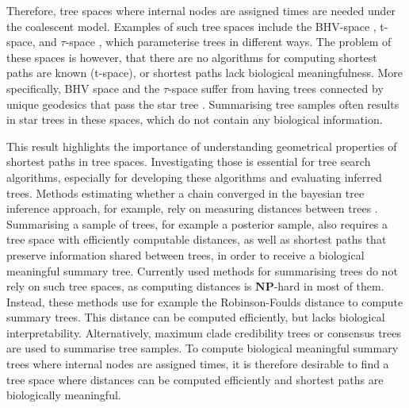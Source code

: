 \documentclass[11pt]{amsart}
\newcommand{\rnni}{\mathrm{RNNI}}
\newcommand{\dtt}{\mathrm{DCT}}
\newcommand{\np}{\mathbf{NP}}
\newcommand{\summary}[1]{} %
\begin{document}
\summary{How recent results about $\rnni$ make this space interesting and that it is strongly connected to $\dtt_m$}
Therefore, tree spaces where internal nodes are assigned times are needed under the coalescent model.
Examples of such tree spaces include the BHV-space \autocite{Billera2001-rj}, t-space, and $\tau$-space \autocite{Gavryushkin2016-uu}, which parameterise trees in different ways.
The problem of these spaces is however, that there are no algorithms for computing shortest paths are known (t-space), or shortest paths lack biological meaningfulness.
More specifically, BHV space and the $\tau$-space suffer from having trees connected by unique geodesics that pass the star tree \autocite{Gavryushkin2016-uu}.
Summarising tree samples often results in star trees in these spaces, which do not contain any biological information.

\summary{Why we want to investigate geometrical properties of $\dtt_m$ and $\rnni$}
This result highlights the importance of understanding geometrical properties of shortest paths in tree spaces.
Investigating those is essential for tree search algorithms, especially for developing these algorithms and evaluating inferred trees.
Methods estimating whether a chain converged in the bayesian tree inference approach, for example, rely on measuring distances between trees \autocite{Nylander2008-wa, Warren2017-df}.
Summarising a sample of trees, for example a posterior sample, also requires a tree space with efficiently computable distances, as well as shortest paths that preserve information shared between trees, in order to receive a biological meaningful summary tree.
Currently used methods for summarising trees do not rely on such tree spaces, as computing distances is $\np$-hard in most of them.
Instead, these methods use for example the Robinson-Foulds distance \autocite{Robinson1981-fb, Bansal2010-vr} to compute summary trees.
This distance can be computed efficiently, but lacks biological interpretability.
Alternatively, maximum clade credibility trees \autocite{Heled2013-sv} or consensus trees \autocite{Margush1981-ba} are used to summarise tree samples.
To compute biological meaningful summary trees where internal nodes are assigned times, it is therefore desirable to find a tree space where distances can be computed efficiently and shortest paths are biologically meaningful.
\end{document}
